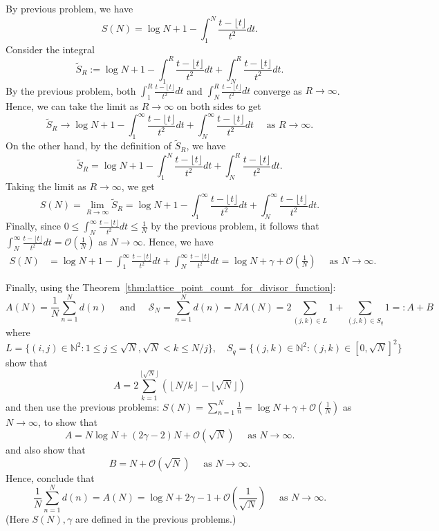 \documentclass{elegantbook}
\begin{document}
\begin{problemset}[Exercises]
  \begin{solution}
      By previous problem, we have
      \[
        S(N) = \log N + 1 - \int_{1}^{N} \frac{t-\lfloor t \rfloor}{t^2} dt.
      \]
      Consider the integral
      \[
        \widetilde{S}_R := \log N + 1 - \int_{1}^{R} \frac{t-\lfloor t \rfloor}{t^2} dt + \int_{N}^{R} \frac{t-\lfloor t \rfloor}{t^2} dt.
      \]
      By the previous problem, both $\int_{1}^{R} \frac{t-\lfloor t \rfloor}{t^2} dt$ and $\int_{N}^{R} \frac{t-\lfloor t \rfloor}{t^2} dt$ converge as $R \to \infty$. Hence, we can take the limit as $R \to \infty$ on both sides to get
      \[
        \widetilde{S}_R \to \log N + 1 - \int_{1}^\infty \frac{t-\lfloor t \rfloor}{t^2} dt + \int_{N}^{\infty} \frac{t-\lfloor t \rfloor}{t^2} dt \quad \text{ as } R \to \infty.
      \]
      On the other hand, by the definition of $\widetilde{S}_R$, we have
      \[
        \widetilde{S}_R = \log N + 1 - \int_{1}^{N} \frac{t-\lfloor t \rfloor}{t^2} dt + \int_{N}^{R} \frac{t-\lfloor t \rfloor}{t^2} dt.
      \]
      Taking the limit as $R\to\infty$, we get
      \[
        S(N) = \lim_{R\to\infty} \widetilde{S}_R = \log N + 1 - \int_{1}^\infty \frac{t-\lfloor t \rfloor}{t^2} dt + \int_{N}^{\infty} \frac{t-\lfloor t \rfloor}{t^2} dt.
      \]
      Finally, since $0 \leq \int_{N}^{\infty} \frac{t-\lfloor t \rfloor}{t^2} dt \leq \frac{1}{N}$ by the previous problem, it follows that $\int_{N}^{\infty} \frac{t-\lfloor t \rfloor}{t^2} dt = \mathcal{O}\left( \frac{1}{N} \right)$ as $N \to \infty$. Hence, we have
      \[
      \begin{aligned}
        S(N) &= \log N + 1 - \int_{1}^\infty \frac{t-\lfloor t \rfloor}{t^2} dt + \int_{N}^{\infty} \frac{t-\lfloor t \rfloor}{t^2} dt = \log N + \gamma + \mathcal{O}\left( \frac{1}{N} \right) \quad \text{ as } N \to \infty.
      \end{aligned}
      \]
  \end{solution}


  \item Finally, using the Theorem~\ref{thm:lattice_point_count_for_divisor_function}:
  \[
    A(N) = \frac{1}{N} \sum_{n=1}^{N} d(n) \quad \text{ and } \quad \mathcal{S}_N = \sum_{n=1}^{N} d(n) = N A(N) = 2 \sum_{(j,k)\in L} 1 + \sum_{(j,k) \in S_q} 1 =: A + B
  \]
  where
  \[
    L = \{(i,j)\in \mathbb{N}^2 : 1 \leq j \leq \sqrt{N}, \sqrt{N} < k \leq N/j \}, \quad S_q = \{ (j,k)\in \mathbb{N}^2 : (j,k) \in [0,\sqrt{N}]^2\}
  \]
  show that
  \[
    A = 2\sum_{k=1}^{\lfloor \sqrt{N} \rfloor} \left( \left\lfloor N/k \right\rfloor - \lfloor \sqrt{N} \rfloor \right) 
  \]
  and then use the previous problems: $S(N) = \sum_{n=1}^{N} \frac{1}{n} = \log N + \gamma + \mathcal{O}\left( \frac{1}{N} \right)$ as $N \to \infty$, to show that
  \[
    A = N \log N + (2\gamma - 2)N + \mathcal{O}(\sqrt{N}) \quad \text{ as } N \to \infty.
  \]
  and also show that
  \[
    B = N + \mathcal{O}(\sqrt{N}) \quad \text{ as } N \to \infty.
  \]
  Hence, conclude that
  \[
    \frac{1}{N} \sum_{n=1}^{N} d(n) = A(N) = \log N + 2\gamma - 1 + \mathcal{O}\left( \frac{1}{\sqrt{N}} \right) \quad \text{ as } N \to \infty.
  \]
  (Here $S(N),\gamma$ are defined in the previous problems.)


\end{problemset}
\end{document}
